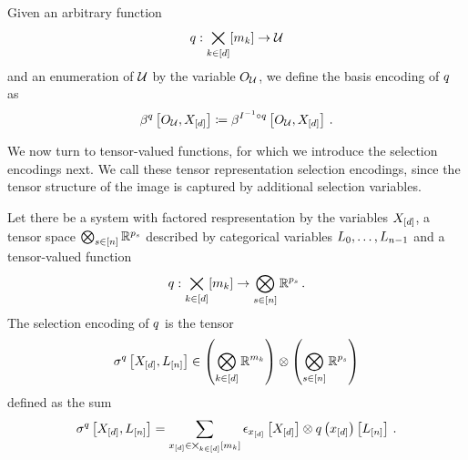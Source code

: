 Given an arbitrary function
\begin{align*}
	q : \bigtimes_{k\in[d]}[m_{k}] \rightarrow \mathcal{U}
\end{align*}
and an enumeration of $\mathcal{U}$ by the variable $O_{\mathcal{U}}$, we define the basis encoding of $q$ as
\begin{align*}
	\beta^{q}\left[O_{\mathcal{U}},X_{[d]}\right]
	\coloneqq \beta^{I^{-1}\circ q}\left[O_{\mathcal{U}},X_{[d]}\right] \, .
\end{align*}


\label{sec:selectionEncodingNotation}

We now turn to tensor-valued functions, for which we introduce the selection encodings next.
We call these tensor representation selection encodings, since the tensor structure of the image is captured by additional selection variables.

\begin{definition}\label{def:selectionEncoding}
	Let there be a system with factored respresentation by the variables $X_{[d]}$, a tensor space $\bigotimes_{s\in[n]}\mathbb{R}^{p_{s}}$ described by categorical variables $L_{0},\ldots,L_{n-1}$ and a tensor-valued function
	\begin{align*}
		q : \bigtimes_{k\in[d]}[m_{k}] \rightarrow \bigotimes_{s\in[n]}\mathbb{R}^{p_{s}} \, .
	\end{align*}
	The selection encoding of $q$ is the tensor
	\begin{align*}
		\sigma^{q}\left[X_{[d]},L_{[n]}\right]
		\in \left(\bigotimes_{k\in[d]} \mathbb{R}^{m_{k}}\right) \otimes \left(\bigotimes_{s\in[n]}\mathbb{R}^{p_{s}}\right)
	\end{align*}
	defined as the sum
	\begin{align*}
		 \sigma^{q}\left[X_{[d]},L_{[n]}\right]
		 = \sum_{x_{[d]}\in\bigtimes_{k\in[d]}[m_{k}]} \epsilon_{x_{[d]}}\left[X_{[d]}\right] \otimes q\left(x_{[d]}\right)\left[L_{[n]}\right] \, .
	\end{align*}
\end{definition}



